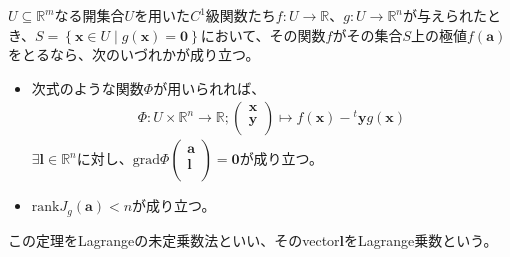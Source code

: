 \documentclass[dvipdfmx]{jsarticle}
\begin{document}
\begin{thm}[Lagrangeの未定乗数法]\label{4.4.4.3}
$U \subseteq \mathbb{R}^{m}$なる開集合$U$を用いた$C^{1}$級関数たち$f:U \rightarrow \mathbb{R}$、$g:U \rightarrow \mathbb{R}^{n}$が与えられたとき、$S = \left\{ \mathbf{x} \in U \middle| g\left( \mathbf{x} \right) = \mathbf{0} \right\}$において、その関数$f$がその集合$S$上の極値$f\left( \mathbf{a} \right)$をとるなら、次のいづれかが成り立つ。
\begin{itemize}
\item
  次式のような関数$\varPhi$が用いられれば、
\begin{align*}
\varPhi:U \times \mathbb{R}^{n} \rightarrow \mathbb{R};\begin{pmatrix}
\mathbf{x} \\
\mathbf{y} \\
\end{pmatrix} \mapsto f\left( \mathbf{x} \right) -{}^t \mathbf{y}g\left( \mathbf{x} \right)
\end{align*}
$\exists\mathbf{l} \in \mathbb{R}^{n}$に対し、$\mathrm{grad}\varPhi\begin{pmatrix}
\mathbf{a} \\
\mathbf{l} \\
\end{pmatrix} = \mathbf{0}$が成り立つ。
\item
  $\mathrm{rank}{J_{g}\left( \mathbf{a} \right)} < n$が成り立つ。
\end{itemize}
この定理をLagrangeの未定乗数法といい、そのvector$\mathbf{l}$をLagrange乗数という。
\end{thm}
\end{document}

